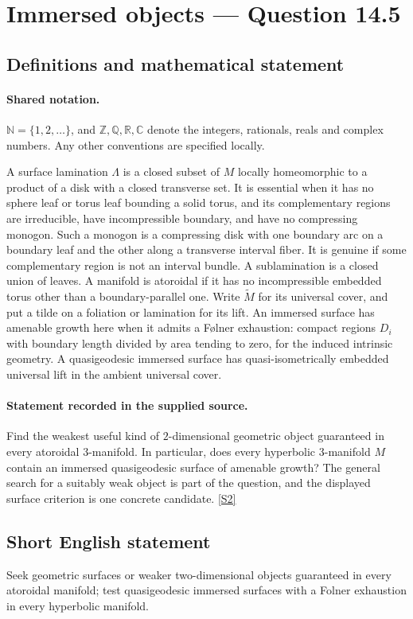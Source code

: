 \documentclass[11pt]{article}
\newcommand{\sref}[2]{\hyperlink{source:#1:#2}{[S#2]}}
\begin{document}
\section{Immersed objects — Question 14.5}\label{statement}

\subsection{Definitions and mathematical statement}

\paragraph{Shared notation.}$\mathbb N=\{1,2,\ldots\}$, and $\mathbb Z,\mathbb Q,\mathbb R,\mathbb C$ denote the integers, rationals, reals and complex numbers. Any other conventions are specified locally.


A surface lamination $\Lambda$ is a closed subset of $M$ locally homeomorphic to a product of a disk with a closed transverse set. It is essential when it has no sphere leaf or torus leaf bounding a solid torus, and its complementary regions are irreducible, have incompressible boundary, and have no compressing monogon. Such a monogon is a compressing disk with one boundary arc on a boundary leaf and the other along a transverse interval fiber. It is genuine if some complementary region is not an interval bundle. A sublamination is a closed union of leaves. A manifold is atoroidal if it has no incompressible embedded torus other than a boundary-parallel one. Write $\widetilde M$ for its universal cover, and put a tilde on a foliation or lamination for its lift. An immersed surface has amenable growth here when it admits a F\o lner exhaustion: compact regions $D_i$ with boundary length divided by area tending to zero, for the induced intrinsic geometry. A quasigeodesic immersed surface has quasi-isometrically embedded universal lift in the ambient universal cover.
\paragraph{Statement recorded in the supplied source.}
Find the weakest useful kind of $2$-dimensional geometric object guaranteed in every atoroidal $3$-manifold. In particular, does every hyperbolic $3$-manifold $M$ contain an immersed quasigeodesic surface of amenable growth? The general search for a suitably weak object is part of the question, and the displayed surface criterion is one concrete candidate. \sref{statement}{2}
\subsection{Short English statement}
Seek geometric surfaces or weaker two-dimensional objects guaranteed in every atoroidal manifold; test quasigeodesic immersed surfaces with a Folner exhaustion in every hyperbolic manifold.
\end{document}
